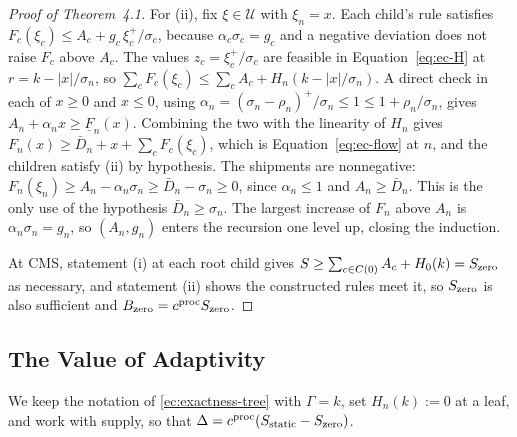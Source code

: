 \documentclass[11pt]{article}
\begin{document}
\begin{proof}[Proof of Theorem~4.1]
For (ii), fix $\xi\in\mathcal U$ with $\xi_n=x$.
Each child's rule satisfies $F_c(\xi_c)\le A_c+g_c\,\xi_c^+/\sigma_c$, because $\alpha_c\sigma_c=g_c$ and a negative deviation does not raise $F_c$ above $A_c$.
The values $z_c=\xi_c^+/\sigma_c$ are feasible in Equation~\ref{eq:ec-H} at $r=k-|x|/\sigma_n$, so $\sum_{c}F_c(\xi_c)\le\sum_{c}A_c+H_n(k-|x|/\sigma_n)$.
A direct check in each of $x\ge0$ and $x\le0$, using $\alpha_n=(\sigma_n-\rho_n)^+/\sigma_n\le1\le1+\rho_n/\sigma_n$, gives $A_n+\alpha_nx\ge\underline F_n(x)$.
Combining the two with the linearity of $H_n$ gives $F_n(x)\ge\bar D_n+x+\sum_{c}F_c(\xi_c)$, which is Equation~\ref{eq:ec-flow} at $n$, and the children satisfy (ii) by hypothesis.
The shipments are nonnegative: $F_n(\xi_n)\ge A_n-\alpha_n\sigma_n\ge\bar D_n-\sigma_n\ge0$, since $\alpha_n\le1$ and $A_n\ge\bar D_n$.
This is the only use of the hypothesis $\bar D_n\ge\sigma_n$.
The largest increase of $F_n$ above $A_n$ is $\alpha_n\sigma_n=g_n$, so $(A_n,g_n)$ enters the recursion one level up, closing the induction.

At CMS, statement (i) at each root child gives $S\ge\sum_{c\in C(0)}A_c+H_0(k)=S_{\rm zero}$ as necessary, and statement (ii) shows the constructed rules meet it, so $S_{\rm zero}$ is also sufficient and $B_{\rm zero}=c^{\text{proc}}S_{\rm zero}$.
\end{proof}

\subsection{The Value of Adaptivity}
\label{ec:gap}

We keep the notation of \Sec\ref{ec:exactness-tree} with $\Gamma = k$, set $H_n(k) := 0$ at a leaf, and work with supply, so that $\Delta = c^{\text{proc}}(S_{\rm static} - S_{\rm zero})$.
\end{document}
